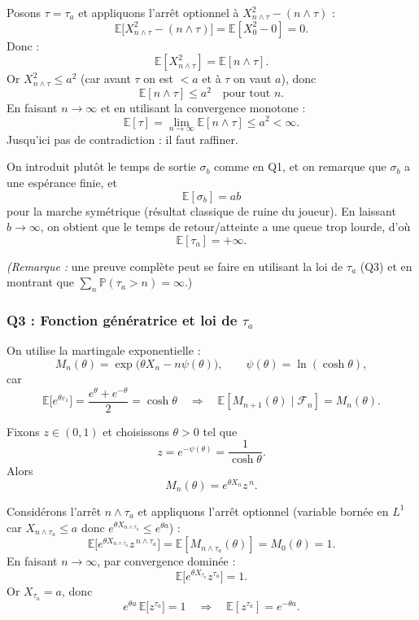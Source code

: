 Posons $\tau=\tau_a$ et appliquons l'arrêt optionnel à $X_{n\wedge\tau}^2-(n\wedge\tau)$ :
\[
\mathbb{E}\!\big[X_{n\wedge\tau}^2-(n\wedge\tau)\big]=\mathbb{E}[X_0^2-0]=0.
\]
Donc :
\[
\mathbb{E}[X_{n\wedge\tau}^2]=\mathbb{E}[n\wedge\tau].
\]
Or $X_{n\wedge\tau}^2\le a^2$ (car avant $\tau$ on est $<a$ et à $\tau$ on vaut $a$), donc
\[
\mathbb{E}[n\wedge\tau]\le a^2 \quad \text{pour tout } n.
\]
En faisant $n\to\infty$ et en utilisant la convergence monotone :
\[
\mathbb{E}[\tau]=\lim_{n\to\infty}\mathbb{E}[n\wedge\tau]\le a^2<\infty.
\]
Jusqu'ici pas de contradiction : il faut raffiner.

On introduit plutôt le temps de sortie $\sigma_b$ comme en Q1, et on remarque que $\sigma_b$ a une espérance finie, et
\[
\mathbb{E}[\sigma_b]=ab
\]
pour la marche symétrique (résultat classique de ruine du joueur). En laissant $b\to\infty$, on obtient que le temps de retour/atteinte a une queue trop lourde, d'où
\[
\boxed{\mathbb{E}[\tau_a]=+\infty.}
\]

\emph{(Remarque :} une preuve complète peut se faire en utilisant la loi de $\tau_a$ (Q3) et en montrant que $\sum_n \mathbb{P}(\tau_a>n)=\infty$.)

\subsubsection*{Q3 : Fonction génératrice et loi de $\tau_a$}

On utilise la martingale exponentielle :
\[
M_n(\theta)=\exp\!\big(\theta X_n-n\psi(\theta)\big),
\qquad \psi(\theta)=\ln(\cosh\theta),
\]
car
\[
\mathbb{E}\big[e^{\theta \varepsilon_1}\big]=\frac{e^\theta+e^{-\theta}}{2}=\cosh\theta
\quad\Rightarrow\quad
\mathbb{E}[M_{n+1}(\theta)\mid\mathcal{F}_n]=M_n(\theta).
\]

Fixons $z\in(0,1)$ et choisissons $\theta>0$ tel que
\[
z=e^{-\psi(\theta)}=\frac{1}{\cosh\theta}.
\]
Alors
\[
M_n(\theta)=e^{\theta X_n} z^{\,n}.
\]

Considérons l'arrêt $n\wedge \tau_a$ et appliquons l'arrêt optionnel (variable bornée en $L^1$ car $X_{n\wedge\tau_a}\le a$ donc $e^{\theta X_{n\wedge\tau_a}}\le e^{\theta a}$) :
\[
\mathbb{E}\big[e^{\theta X_{n\wedge\tau_a}} z^{\,n\wedge\tau_a}\big]=\mathbb{E}[M_{n\wedge\tau_a}(\theta)]=M_0(\theta)=1.
\]
En faisant $n\to\infty$, par convergence dominée :
\[
\mathbb{E}\big[e^{\theta X_{\tau_a}} z^{\tau_a}\big]=1.
\]
Or $X_{\tau_a}=a$, donc
\[
e^{\theta a}\,\mathbb{E}\big[z^{\tau_a}\big]=1
\quad\Rightarrow\quad
\boxed{\mathbb{E}[z^{\tau_a}]=e^{-\theta a}.}
\]

